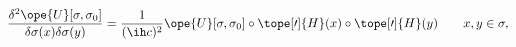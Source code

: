 \begin{equation}	\label{12.31}
\frac{\delta^2\ope{U}[\sigma,\sigma_0]}{\delta\sigma(x)\delta\sigma(y)}
=
\frac{1}{(\ih c)^2}
\ope{U}[\sigma,\sigma_0]\circ \tope[\prime]{H}(x)\circ \tope[\prime]{H}(y)
\qquad
x,y\in\sigma ,
	\end{equation}

